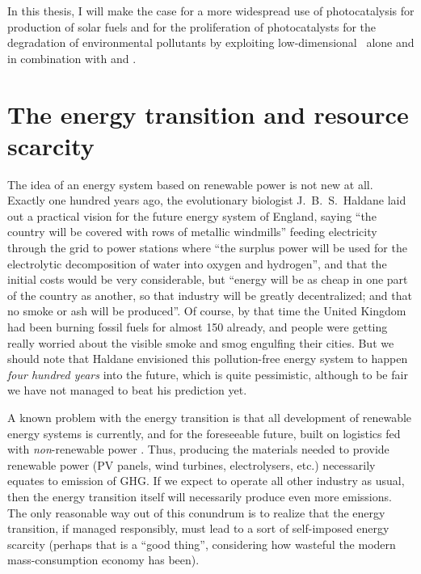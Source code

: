 \documentclass[webedition,openright,titles,swedish,english]{LuaUUThesis}\usepackage[]{graphicx}\usepackage[]{xcolor}
\newcommand{\etc}{etc.}
\begin{document}
In this thesis, I will make the case for a more widespread use of photocatalysis
for production of solar fuels and for the proliferation of photocatalysts for
the degradation of environmental pollutants by exploiting low-dimensional
\ZnO\ alone and in combination with  and .




\section{The energy transition and resource scarcity}
\label{intro:energy-transition}

The idea of an energy system based on renewable power is not new at all.
Exactly one hundred years ago, the evolutionary biologist \mbox{J.\ B.\ S.\ Haldane}
laid out a practical vision for the future energy system of England, saying
\cite{Haldane1923,Rajeshwar2008}
\enquote{the country will be covered with rows of metallic windmills}
feeding electricity through the grid to power stations where
\enquote{the surplus power will be used for the electrolytic decomposition of water
into oxygen and hydrogen}, and that the initial costs would be very considerable,
but \enquote{energy will be as cheap in one part of the country as another, so that
industry will be greatly decentralized; and that no smoke or ash will be produced}.
Of course, by that time the United Kingdom had been burning fossil fuels
for almost \qty{150}{\years} already, and people were getting really
worried about the visible smoke and smog engulfing their cities.
But we should note that Haldane envisioned this pollution-free energy system to
happen \emph{four hundred years} into the future, which is quite pessimistic, although
to be fair we have not managed to beat his prediction yet.

A known problem with the energy transition is that all development of renewable
energy systems is currently, and for the foreseeable future, built on logistics
fed with \emph{non}-renewable power \cite{Roos2021}.
Thus, producing the materials needed to provide renewable power
(\gls{PV} panels, wind turbines, electrolysers, \etc)
necessarily equates to emission of \gls{GHG}.
If we expect to operate all other industry as usual, then the energy transition
itself will necessarily produce even more emissions.
The only reasonable way out of this conundrum is to realize that the energy
transition, if managed responsibly, must lead to a sort of self-imposed energy scarcity
(perhaps that is a \enquote{good thing}, considering how wasteful the modern
mass-consumption economy has been).
\end{document}
